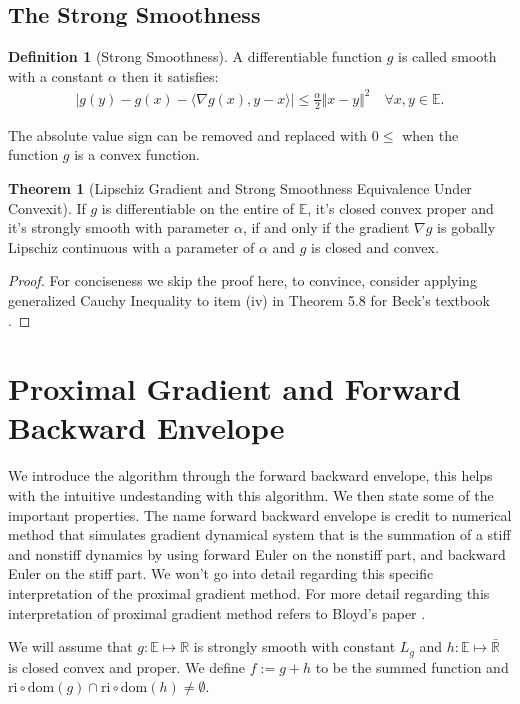 \documentclass[]{article}
\theoremstyle{definition}
\newtheorem{theorem}{Theorem}       %
\newtheorem{definition}{Definition}
\begin{document}
    \subsection{The Strong Smoothness}
        \begin{definition}[Strong Smoothness]\label{def:strong_smoothness}
            A differentiable function $g$ is called smooth with a constant $\alpha$ then it satisfies: 
            \begin{align}
                |g(y) - g(x) - 
                \langle \nabla g(x), y - x
                \rangle| \le \frac{\alpha}{2}\Vert x - y\Vert^2
                \quad \forall x, y\in \mathbb E. 
            \end{align}    
        \end{definition}
        The absolute value sign can be removed and replaced with $0\le$ when the function $g$ is a convex function.
        \begin{theorem}[Lipschiz Gradient and Strong Smoothness Equivalence Under Convexit]\label{thm:cvx_lipz_grad}
            If $g$ is differentiable on the entire of $\mathbb E$, it's closed convex proper and it's strongly smooth with parameter $\alpha$, if and only if the gradient $\nabla g$ is gobally Lipschiz continuous with a parameter of $\alpha$ and $g$ is closed and convex. 
        \end{theorem}
        \begin{proof}
            For conciseness we skip the proof here, to convince, consider applying generalized Cauchy Inequality to item (iv) in Theorem 5.8 for Beck's textbook \cite{paper:FISTA}. 
        \end{proof}
        
\section{Proximal Gradient and Forward Backward Envelope}\label{sec:pg_forward_backward_env}
    We introduce the algorithm through the forward backward envelope, this helps with the intuitive undestanding with this algorithm. We then state some of the important properties. The name forward backward envelope is credit to numerical method that simulates gradient dynamical system that is the summation of a stiff and nonstiff dynamics by using forward Euler on the nonstiff part, and backward Euler on the stiff part. We won't go into detail regarding this specific interpretation of the proximal gradient method. For more detail regarding this interpretation of proximal gradient method refers to Bloyd's paper \cite{paper:bloyd}. 
    \begin{assumption}\label{assumption:1}
        We will assume that $g:\mathbb E\mapsto \mathbb R$ is strongly smooth with constant $L_g$ and $h:\mathbb E \mapsto \bar{\mathbb R}$ is closed convex and proper. We define $f := g + h$ to be the summed function and $\text{ri}\circ \text{dom}(g) \cap \text{ri}\circ \text{dom}(h) \neq \emptyset$. 
    \end{assumption}
    
\end{document}

